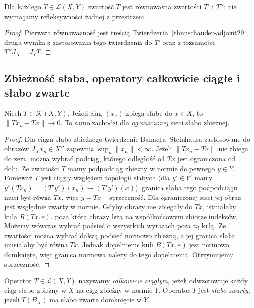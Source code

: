 \begin{wniosek}
\label{cor:schauder-iterated29}
Dla każdego $T\in\mathcal L(X,Y)$ zwartość $T$ jest
równoważna zwartości $T'$ i $T''$; nie wymagamy
refleksywności żadnej z przestrzeni.
\end{wniosek}
\begin{proof}
Pierwsza równoważność jest treścią
Twierdzenia~\ref{thm:schauder-adjoint29}; druga wynika
z zastosowania tego twierdzenia do $T'$ oraz z tożsamości
$T''J_X=J_YT$.
\end{proof}

\subsection{Zbieżność słaba, operatory całkowicie ciągłe i słabo zwarte}

\begin{twierdzenie}
\label{thm:weak-norm29}
Niech $T\in\mathcal K(X,Y)$. Jeżeli ciąg $(x_n)$ zbiega
słabo do $x\in X$, to $\|Tx_n-Tx\|\to0$.
To samo zachodzi dla \emph{ograniczonej} sieci słabo zbieżnej.
\end{twierdzenie}
\begin{proof}
Dla ciągu słabo zbieżnego twierdzenie Banacha--Steinhausa
zastosowane do obrazów $J_Xx_n\in X''$ zapewnia
$\sup_n\|x_n\|<\infty$. Jeżeli $\|Tx_n-Tx\|$ nie zbiega
do zera, można wybrać podciąg, którego odległość od $Tx$
jest ograniczona od dołu. Ze zwartości $T$ mamy podpodciąg
zbieżny w normie do pewnego $y\in Y$. Ponieważ $T$
jest ciągły względem topologii słabych (dla $y'\in Y'$
mamy $y'(Tx_n)=(T'y')(x_n)\to (T'y')(x)$),
granica słaba tego podpodciągu
musi być równa $Tx$, więc $y=Tx$ -- sprzeczność.
Dla ograniczonej sieci jej obraz jest względnie zwarty
w normie. Gdyby obrazy nie zbiegały do $Tx$, istniałaby
kula $B(Tx,\varepsilon)$, poza którą obrazy leżą
na współkońcowym zbiorze indeksów. Możemy wówczas
wybrać podsieć o wszystkich wyrazach poza tą kulą.
Ze zwartości można wybrać dalszą podsieć normowo zbieżną,
a jej granica słaba musiałaby być równa $Tx$.
Jednak dopełnienie kuli $B(Tx,\varepsilon)$ jest normowo
domknięte, więc granica normowa należy do tego dopełnienia.
Otrzymujemy sprzeczność.
\end{proof}

\begin{definicja}
\label{def:completely-continuous29}
Operator $T\in\mathcal L(X,Y)$ nazywamy
\emph{całkowicie ciągłym}, jeżeli odwzorowuje każdy ciąg
słabo zbieżny w $X$ na ciąg zbieżny w normie $Y$.
Operator $T$ jest \emph{słabo zwarty}, jeżeli
$T(B_X)$ ma słabo zwarte domknięcie w $Y$.
\end{definicja}

